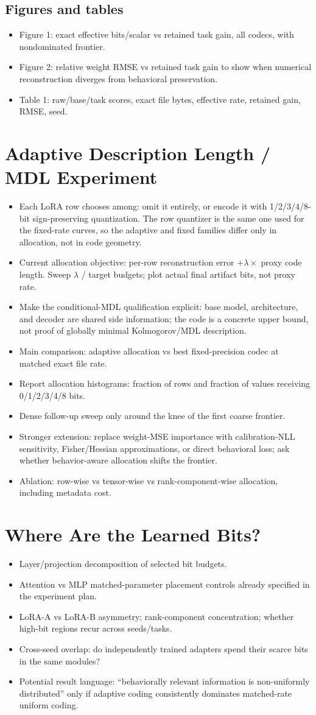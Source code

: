 \documentclass[10pt]{article}
\newcommand{\paperidea}[1]{\item #1}
\begin{document}
\subsection{Figures and tables}
\begin{itemize}
  \paperidea{Figure 1: exact effective bits/scalar vs retained task gain, all codecs, with nondominated frontier.}
  \paperidea{Figure 2: relative weight RMSE vs retained task gain to show when numerical reconstruction diverges from behavioral preservation.}
  \paperidea{Table 1: raw/base/task scores, exact file bytes, effective rate, retained gain, RMSE, seed.}
\end{itemize}

\section{Adaptive Description Length / MDL Experiment}
\begin{itemize}
  \paperidea{Each LoRA row chooses among: omit it entirely, or encode it with 1/2/3/4/8-bit sign-preserving quantization. The row quantizer is the same one used for the fixed-rate curves, so the adaptive and fixed families differ only in allocation, not in code geometry.}
  \paperidea{Current allocation objective: per-row reconstruction error $+\lambda\times$ proxy code length. Sweep $\lambda$ / target budgets; plot actual final artifact bits, not proxy rate.}
  \paperidea{Make the conditional-MDL qualification explicit: base model, architecture, and decoder are shared side information; the code is a concrete upper bound, not proof of globally minimal Kolmogorov/MDL description.}
  \paperidea{Main comparison: adaptive allocation vs best fixed-precision codec at matched exact file rate.}
  \paperidea{Report allocation histograms: fraction of rows and fraction of values receiving 0/1/2/3/4/8 bits.}
  \paperidea{Dense follow-up sweep only around the knee of the first coarse frontier.}
  \paperidea{Stronger extension: replace weight-MSE importance with calibration-NLL sensitivity, Fisher/Hessian approximations, or direct behavioral loss; ask whether behavior-aware allocation shifts the frontier.}
  \paperidea{Ablation: row-wise vs tensor-wise vs rank-component-wise allocation, including metadata cost.}
\end{itemize}

\section{Where Are the Learned Bits?}
\begin{itemize}
  \paperidea{Layer/projection decomposition of selected bit budgets.}
  \paperidea{Attention vs MLP matched-parameter placement controls already specified in the experiment plan.}
  \paperidea{LoRA-A vs LoRA-B asymmetry; rank-component concentration; whether high-bit regions recur across seeds/tasks.}
  \paperidea{Cross-seed overlap: do independently trained adapters spend their scarce bits in the same modules?}
  \paperidea{Potential result language: ``behaviorally relevant information is non-uniformly distributed'' only if adaptive coding consistently dominates matched-rate uniform coding.}
\end{itemize}
\end{document}
